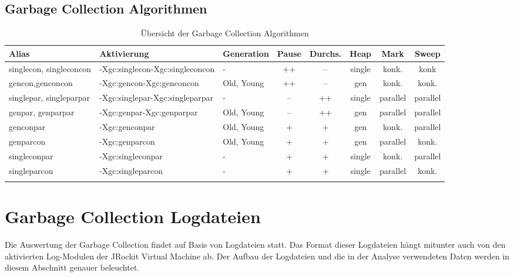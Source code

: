 \subsection{Garbage Collection Algorithmen}
  \begin{longtable}{|p{2cm}|p{2.8cm}|l|c|c|c|c|c|}
    \hline
  \textbf{Alias} & \textbf{Aktivierung}& \textbf{Generation} & \textbf{Pause} &\textbf{Durchs.} & \textbf{Heap} & \textbf{Mark} & \textbf{Sweep} \\\hline
  singlecon, singleconcon & -Xgc:singlecon\newline-Xgc:singleconcon& - &++&--& single & konk. & konk\\\hline

  gencon,\newline genconcon& -Xgc:gencon\newline-Xgc:genconcon &Old, Young&++&-- & gen & konk. & konk.\\\hline	
 
  singlepar, \newline singleparpar& -Xgc:singlepar\newline-Xgc:singleparpar & - & -- & ++ & single & parallel & parallel \\\hline
  genpar, \newline genparpar& -Xgc:genpar\newline-Xgc:genparpar & Old, Young & -- & ++ & gen& parallel & parallel \\\hline
  genconpar &-Xgc:genconpar&Old, Young&+&+&gen& konk. & parallel \\\hline
  genparcon &-Xgc:genparcon&Old, Young&+&+&gen& parallel & konk. \\\hline
  singleconpar &-Xgc:singleconpar&-&+&+&single&konk. & parallel \\\hline
  singleparcon& -Xgc:singleparcon&-&+&+&single&parallel & konk. \\\hline
\caption{Übersicht der Garbage Collection Algorithmen}
  \end{longtable}

\section{Garbage Collection Logdateien}\label{jrockitgclog}
Die Auswertung der Garbage Collection findet auf Basis von Logdateien statt. Das Format dieser Logdateien hängt mitunter auch von den aktivierten Log-Modulen der JRockit Virtual Machine ab. Der Aufbau der Logdateien und die in der Analyse verwendeten Daten werden in diesem Abschnitt genauer beleuchtet.


